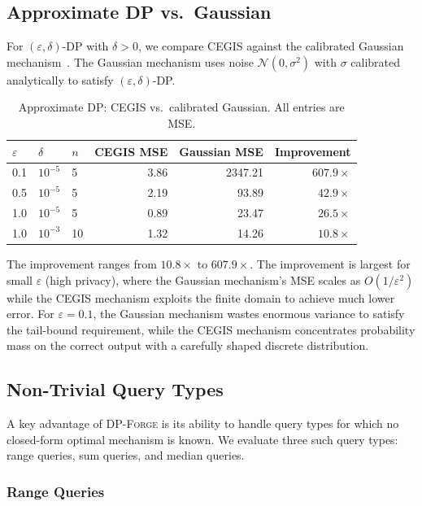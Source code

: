 \documentclass[11pt,a4paper]{article}
\newcommand{\dpforge}{\textsc{DP-Forge}}
\newcommand{\eps}{\varepsilon}
\begin{document}
\subsection{Approximate DP vs.\ Gaussian}
\label{subsec:approxdp}

For $(\eps, \delta)$-DP with $\delta > 0$, we compare CEGIS against the
calibrated Gaussian mechanism~\cite{balle2018improving}.  The Gaussian mechanism
uses noise $\mathcal{N}(0, \sigma^2)$ with $\sigma$ calibrated analytically to
satisfy $(\eps, \delta)$-DP.

\begin{table}[t]
\centering
\caption{Approximate DP: CEGIS vs.\ calibrated Gaussian.  All entries are MSE.}
\label{tab:approxdp}
\begin{tabular}{@{}lllrrr@{}}
\toprule
$\eps$ & $\delta$ & $n$ & CEGIS MSE & Gaussian MSE & Improvement \\
\midrule
0.1 & $10^{-5}$ & 5  & 3.86   & 2347.21 & $607.9\times$ \\
0.5 & $10^{-5}$ & 5  & 2.19   & 93.89   & $42.9\times$ \\
1.0 & $10^{-5}$ & 5  & 0.89   & 23.47   & $26.5\times$ \\
1.0 & $10^{-3}$ & 10 & 1.32   & 14.26   & $10.8\times$ \\
\bottomrule
\end{tabular}
\end{table}

The improvement ranges from $10.8\times$ to $607.9\times$.  The improvement is
largest for small $\eps$ (high privacy), where the Gaussian mechanism's MSE
scales as $O(1/\eps^2)$ while the CEGIS mechanism exploits the finite domain
to achieve much lower error.  For $\eps = 0.1$, the Gaussian mechanism wastes
enormous variance to satisfy the tail-bound requirement, while the CEGIS
mechanism concentrates probability mass on the correct output with a carefully
shaped discrete distribution.

\subsection{Non-Trivial Query Types}
\label{subsec:nontrivial}

A key advantage of \dpforge{} is its ability to handle query types for which no
closed-form optimal mechanism is known.  We evaluate three such query types:
range queries, sum queries, and median queries.

\subsubsection{Range Queries}
\end{document}
